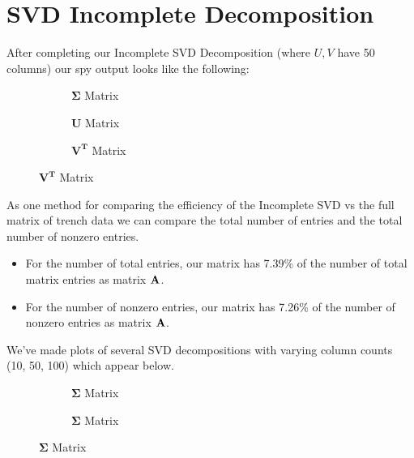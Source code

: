 \documentclass[letterpaper,12pt]{article}
\begin{document}
\section{SVD Incomplete Decomposition}
After completing our Incomplete SVD Decomposition (where \(U,V\) have 50 columns) our spy output looks like the following:
\begin{figure}[H]
    \begin{adjustwidth}{-1in}{-1in}
    \centering
    \begin{subfigure}[b]{0.65\textwidth}
        \centering
        
        \caption{\(\mathbf{\Sigma}\) Matrix}
    \end{subfigure}
    \hfill
    \begin{subfigure}[b]{0.65\textwidth}
        \centering
        
        \caption{\(\mathbf{U}\) Matrix}
    \end{subfigure}
    \hfill
    \begin{subfigure}[b]{0.65\textwidth}
        \centering
        
        \caption{\(\mathbf{V^T}\) Matrix}
    \end{subfigure}
    \end{adjustwidth}
\end{figure}
As one method for comparing the efficiency of the Incomplete SVD vs the full matrix of trench data we can compare the total number of entries and the total number of nonzero entries.
\begin{itemize}
    \item For the number of total entries, our matrix has 7.39\% of the number of total matrix entries as matrix \(\vb{A}\).
    \item For the number of nonzero entries, our matrix has 7.26\% of the number of nonzero entries as matrix \(\vb{A}\).
\end{itemize}
We've made plots of several SVD decompositions with varying column counts (10, 50, 100) which appear below.
\begin{figure}[H]
    \centering
    \begin{adjustwidth}{-1in}{-1in}
    \begin{subfigure}[b]{0.65\textwidth}
        \centering
        
        \caption{\(\mathbf{\Sigma}\) Matrix}
    \end{subfigure}
    \begin{subfigure}[b]{0.65\textwidth}
        \centering
        
        \caption{\(\mathbf{\Sigma}\) Matrix}
    \end{subfigure}
    \end{adjustwidth}
\end{figure}
\end{document}
